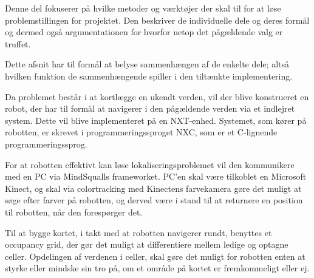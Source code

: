 Denne del fokuserer på hvilke metoder og værktøjer der skal til for at løse problemstillingen for projektet.
Den beskriver de individuelle dele og deres formål og dermed også argumentationen for hvorfor netop det pågældende valg er truffet.

Dette afsnit har til formål at belyse sammenhængen af de enkelte dele; altså hvilken funktion de sammenhængende spiller i den tiltænkte implementering.

Da problemet består i at kortlægge en ukendt verden, vil der blive konstrueret en robot, der har til formål at navigerer i den pågældende verden via et indlejret system.
Dette vil blive implementeret på en NXT-enhed.
Systemet, som kører på robotten, er skrevet i programmeringssproget NXC, som er et C-lignende programmeringssprog.

For at robotten effektivt kan løse lokaliseringsproblemet vil den kommunikere med en PC via MindSqualls frameworket.
PC'en skal være tilkoblet en Microsoft Kinect, og skal via colortracking med Kinectens farvekamera gøre det muligt at søge efter farver på robotten, og derved være i stand til at returnere en position til robotten, når den forespørger det.

Til at bygge kortet, i takt med at robotten navigerer rundt, benyttes et occupancy grid, der gør det muligt at differentiere mellem ledige og optagne celler.
Opdelingen af verdenen i celler, skal gøre det muligt for robotten enten at styrke eller mindske sin tro på, om et område på kortet er fremkommeligt eller ej.